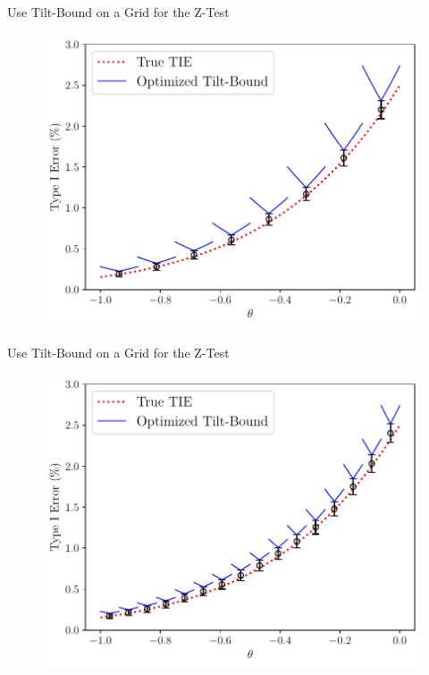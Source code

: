 \begin{frame}{Use Tilt-Bound on a Grid for the Z-Test}
\begin{figure}
    \centering
    \includegraphics[width=0.95\linewidth]{figs/validation_8.pdf}
\end{figure} 
\end{frame}

\begin{frame}{Use Tilt-Bound on a Grid for the Z-Test}
\begin{figure}
    \centering
    \includegraphics[width=0.95\linewidth]{figs/validation_16.pdf}
\end{figure} 
\end{frame}

